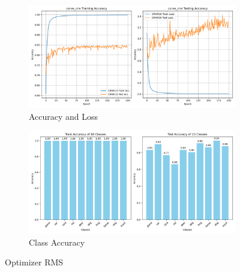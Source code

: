 \documentclass{article}
\begin{document}
\begin{appendix}
\begin{figure}[!htbp]
  \centering
  \begin{subfigure}[b]{1\textwidth}
    \includegraphics[width=\textwidth]{img/Part2/optimizer/curve_cnn_RMS.png}
    \caption{Accuracy and Loss}
  \end{subfigure}
  \begin{subfigure}[b]{1\textwidth}
    \includegraphics[width=\textwidth]{img/Part2/optimizer/acc_cnn_class_RMS.png}
    \caption{Class Accuracy}
  \end{subfigure}
  \caption{Optimizer RMS}
  \label{fig:p2_RMS}
\end{figure}


\end{appendix}
\end{document}
